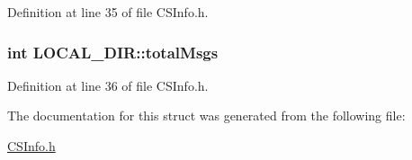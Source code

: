 Definition at line 35 of file CSInfo.h.\hypertarget{structLOCAL__DIR_a7b6fc663de7fb68253bbff3496243d99}{
\subsubsection[{totalMsgs}]{\setlength{\rightskip}{0pt plus 5cm}int {\bf LOCAL\_\-DIR::totalMsgs}}}
\label{structLOCAL__DIR_a7b6fc663de7fb68253bbff3496243d99}


Definition at line 36 of file CSInfo.h.

The documentation for this struct was generated from the following file:\begin{DoxyCompactItemize}
\item 
\hyperlink{CSInfo_8h}{CSInfo.h}\end{DoxyCompactItemize}

